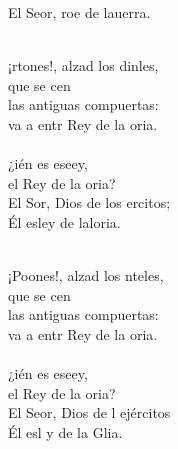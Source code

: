 \begin{cancion}
\begin{chorus}
	El Seor, roe de lauerra. \\
	\end{chorus}%
	\jump\\
	¡rtones!, alzad los dinles, \\
	que se cen\\
las antiguas compuertas:\\
	va a entr  Rey de la oria.\\
\jump\\
	¿ién es eseey, \\
	el Rey de la oria?\\
	El Sor, Dios de los ercitos;  \\
	Él esley de laloria.\\\jump\\
	\begin{chorus}%
	¡Poones!, alzad los nteles,\\
	que se cen\\
las antiguas compuertas:\\
	va a entr  Rey de la oria.\\
\jump\\
	¿ién es eseey, \\
	el Rey de la oria?\\
	El Seor, Dios de l ejércitos\\
	Él esl y de la Glia.\\
	\end{chorus}%
	\jump\\
\end{cancion}%
